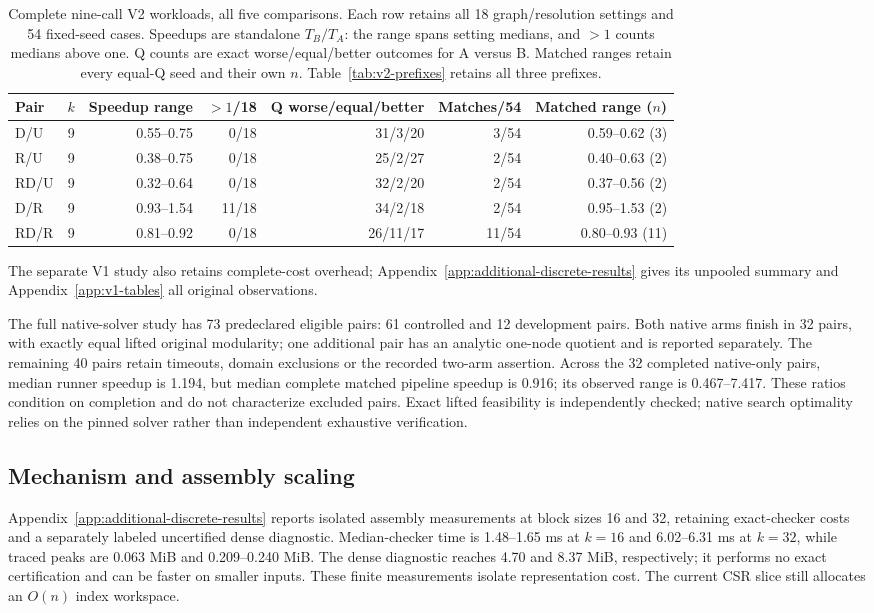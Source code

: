 \documentclass[sigconf,anonymous,review]{acmart}
\newcommand{\1}{\mathbf{1}}
\begin{document}
\begin{table}[t]
\caption{Complete nine-call V2 workloads, all five comparisons. Each row retains all 18 graph/resolution settings and 54 fixed-seed cases. Speedups are standalone $T_B/T_A$: the range spans setting medians, and $>1$ counts medians above one. Q counts are exact worse/equal/better outcomes for A versus B. Matched ranges retain every equal-Q seed and their own $n$. Table~\ref{tab:v2-prefixes} retains all three prefixes.}\label{tab:v2-main}
\centering\small
\begin{tabular}{lcrrrrr}\toprule
Pair & $k$ & Speedup range & $>1$/18 & Q worse/equal/better & Matches/54 & Matched range ($n$)\\\midrule
D/U & 9 & 0.55--0.75 & 0/18 & 31/3/20 & 3/54 & 0.59--0.62 (3)\\
R/U & 9 & 0.38--0.75 & 0/18 & 25/2/27 & 2/54 & 0.40--0.63 (2)\\
RD/U & 9 & 0.32--0.64 & 0/18 & 32/2/20 & 2/54 & 0.37--0.56 (2)\\
D/R & 9 & 0.93--1.54 & 11/18 & 34/2/18 & 2/54 & 0.95--1.53 (2)\\
RD/R & 9 & 0.81--0.92 & 0/18 & 26/11/17 & 11/54 & 0.80--0.93 (11)\\
\bottomrule\end{tabular}
\end{table}

The separate V1 study also retains complete-cost overhead; Appendix~\ref{app:additional-discrete-results} gives its unpooled summary and Appendix~\ref{app:v1-tables} all original observations.

The full native-solver study has 73 predeclared eligible pairs: 61 controlled
and 12 development pairs. Both native arms finish in 32 pairs, with exactly
equal lifted original modularity; one additional pair has an analytic one-node
quotient and is reported separately. The remaining 40 pairs retain timeouts,
domain exclusions or the recorded two-arm assertion. Across the 32 completed
native-only pairs, median runner speedup is 1.194, but median complete matched
pipeline speedup is 0.916; its observed range is 0.467--7.417. These ratios
condition on completion and do not characterize excluded pairs. Exact lifted
feasibility is independently checked; native search optimality relies on the
pinned solver rather than independent exhaustive verification.

\subsection{Mechanism and assembly scaling}
Appendix~\ref{app:additional-discrete-results} reports isolated assembly measurements
at block sizes 16 and 32, retaining exact-checker costs and a separately labeled
uncertified dense diagnostic. Median-checker time is 1.48--1.65 ms at $k=16$
and 6.02--6.31 ms at $k=32$, while traced peaks are 0.063 MiB and
0.209--0.240 MiB. The dense diagnostic reaches 4.70 and 8.37 MiB,
respectively; it performs no exact certification and can be faster on smaller
inputs. These finite measurements isolate representation cost. The current
CSR slice still allocates an $O(n)$ index workspace.
\end{document}
